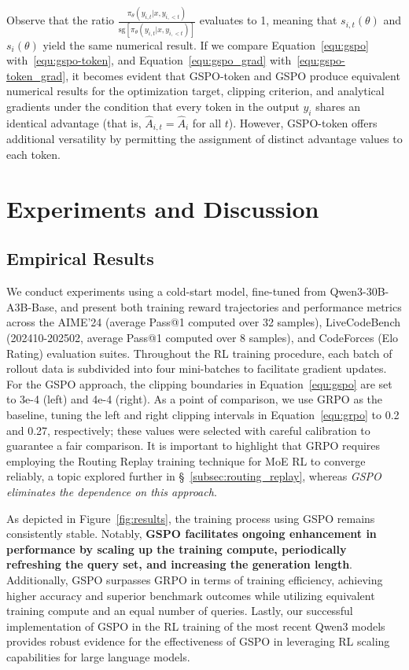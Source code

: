 Observe that the ratio $\frac{ \pi_{\theta} (y_{i,t} | x, y_{i,<t}) }{ \mathrm{sg} \left[ \pi_{\theta} (y_{i,t} | x, y_{i,<t}) \right] }$ evaluates to 1, meaning that $s_{i,t}(\theta)$ and $s_{i}(\theta)$ yield the same numerical result. If we compare Equation~\eqref{equ:gspo} with~\eqref{equ:gspo-token}, and Equation~\eqref{equ:gspo_grad} with~\eqref{equ:gspo-token_grad}, it becomes evident that GSPO-token and GSPO produce equivalent numerical results for the optimization target, clipping criterion, and analytical gradients under the condition that every token in the output $y_i$ shares an identical advantage (that is, $\widehat{A}_{i,t} = \widehat{A}_{i}$ for all $t$). However, GSPO-token offers additional versatility by permitting the assignment of distinct advantage values to each token.

\section{Experiments and Discussion}

\subsection{Empirical Results}

We conduct experiments using a cold-start model, fine-tuned from Qwen3-30B-A3B-Base, and present both training reward trajectories and performance metrics across the AIME'24 (average Pass@1 computed over 32 samples), LiveCodeBench (202410-202502, average Pass@1 computed over 8 samples), and CodeForces (Elo Rating) evaluation suites. Throughout the RL training procedure, each batch of rollout data is subdivided into four mini-batches to facilitate gradient updates. For the GSPO approach, the clipping boundaries in Equation~\eqref{equ:gspo} are set to 3e-4 (left) and 4e-4 (right). As a point of comparison, we use GRPO as the baseline, tuning the left and right clipping intervals in Equation~\eqref{equ:grpo} to 0.2 and 0.27, respectively; these values were selected with careful calibration to guarantee a fair comparison. It is important to highlight that GRPO requires employing the Routing Replay training technique for MoE RL to converge reliably, a topic explored further in \S~\ref{subsec:routing_replay}, whereas \textit{GSPO eliminates the dependence on this approach}.

As depicted in Figure~\ref{fig:results}, the training process using GSPO remains consistently stable. Notably, \textbf{GSPO facilitates ongoing enhancement in performance by scaling up the training compute, periodically refreshing the query set, and increasing the generation length}. Additionally, GSPO surpasses GRPO in terms of training efficiency, achieving higher accuracy and superior benchmark outcomes while utilizing equivalent training compute and an equal number of queries. Lastly, our successful implementation of GSPO in the RL training of the most recent Qwen3 models provides robust evidence for the effectiveness of GSPO in leveraging RL scaling capabilities for large language models.


